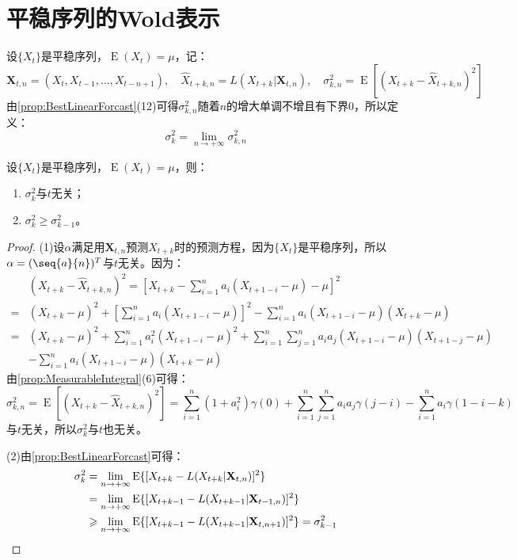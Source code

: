 \section{平稳序列的Wold表示}
\begin{definition}
	设$\{X_t\}$是平稳序列，$\operatorname{E}(X_t)=\mu$，记：
	\begin{equation*}
		\mathbf{X}_{t,n}=(X_t,X_{t-1},\dots,X_{t-n+1}),\quad\hat{X}_{t+k,n}=L(X_{t+k}|\mathbf{X}_{t,n}),\quad\sigma_{k,n}^2=\operatorname{E}[(X_{t+k}-\hat{X}_{t+k,n})^2]
	\end{equation*}
	由\cref{prop:BestLinearForcast}(12)可得$\sigma_{k,n}^2$随着$n$的增大单调不增且有下界$0$，所以定义：
	\begin{equation*}
		\sigma_k^2=\lim_{n\to+\infty}\sigma_{k,n}^2
	\end{equation*}
\end{definition}
\begin{property}
	设$\{X_t\}$是平稳序列，$\operatorname{E}(X_t)=\mu$，则：
	\begin{enumerate}
		\item $\sigma_k^2$与$t$无关；
		\item $\sigma_k^2\geqslant\sigma_{k-1}^2$。
	\end{enumerate}
\end{property}
\begin{proof}
	(1)设$\alpha$满足用$\mathbf{X}_{t,n}$预测$X_{t+k}$时的预测方程，因为$\{X_t\}$是平稳序列，所以$\alpha=(\seq{a}{n})^T$与$t$无关。因为：
	\begin{align*}
		&(X_{t+k}-\hat{X}_{t+k,n})^2=\left[X_{t+k}-\sum_{i=1}^{n}a_i(X_{t+1-i}-\mu)-\mu\right]^2 \\
		=&(X_{t+k}-\mu)^2+\left[\sum_{i=1}^{n}a_i(X_{t+1-i}-\mu)\right]^2-\sum_{i=1}^{n}a_i(X_{t+1-i}-\mu)(X_{t+k}-\mu) \\
		=&(X_{t+k}-\mu)^2+\sum_{i=1}^{n}a_i^2(X_{t+1-i}-\mu)^2+\sum_{i=1}^{n}\sum_{j=1}^{n}a_ia_j(X_{t+1-i}-\mu)(X_{t+1-j}-\mu) \\
		&-\sum_{i=1}^{n}a_i(X_{t+1-i}-\mu)(X_{t+k}-\mu)
	\end{align*}
	由\cref{prop:MeasurableIntegral}(6)可得：
	\begin{equation*}
		\sigma_{k,n}^2=\operatorname{E}[(X_{t+k}-\hat{X}_{t+k,n})^2]=\sum_{i=1}^{n}(1+a_i^2)\gamma(0)+\sum_{i=1}^{n}\sum_{j=1}^{n}a_ia_j\gamma(j-i)-\sum_{i=1}^{n}a_i\gamma(1-i-k)
	\end{equation*}
	与$t$无关，所以$\sigma_k^2$与$t$也无关。\par
	(2)由\cref{prop:BestLinearForcast}可得：
	\begin{align*}
		\sigma_k^2&=\lim_{n\to+\infty}\operatorname{E}\{[X_{t+k}-L(X_{t+k}|\mathbf{X}_{t,n})]^2\} \\
		&=\lim_{n\to+\infty}\operatorname{E}\{[X_{t+k-1}-L(X_{t+k-1}|\mathbf{X}_{t-1,n})]^2\} \\
		&\geqslant\lim_{n\to+\infty}\operatorname{E}\{[X_{t+k-1}-L(X_{t+k-1}|\mathbf{X}_{t,n+1})]^2\}=\sigma_{k-1}^2\qedhere
	\end{align*}
\end{proof}

